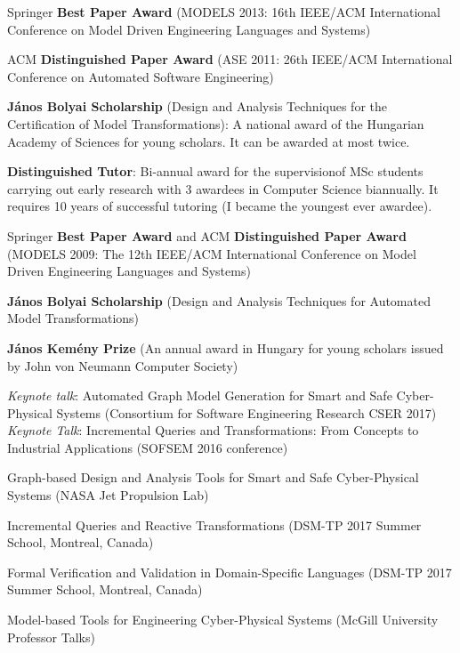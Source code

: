 \documentclass{xetexCV}
\begin{document}
Springer  \textbf{Best Paper Award} (MODELS 2013: 16th IEEE/ACM International Conference on Model Driven 
Engineering Languages and Systems) 

ACM \textbf{Distinguished Paper Award} (ASE 2011: 26th IEEE/ACM International Conference on Automated Software Engineering) 

\textbf{J\'anos Bolyai Scholarship} (Design and Analysis Techniques for the Certification of Model Transformations): A national award of the Hungarian Academy of Sciences for young scholars. It can be awarded
at most twice.

\textbf{Distinguished Tutor}:  Bi-annual award for the supervisionof MSc students carrying out early research with 3 awardees in Computer Science biannually. It requires 10 years of successful tutoring (I became the youngest ever awardee). 

Springer \textbf{Best Paper Award} and ACM \textbf{Distinguished Paper Award} \newline (MODELS
2009: The 12th IEEE/ACM International Conference on Model Driven Engineering Languages and
Systems) 

\textbf{J\'anos Bolyai Scholarship}  (Design and Analysis Techniques
for Automated Model Transformations) 

\textbf{J\'anos Kem\'eny Prize } (An annual
award in Hungary for young scholars issued by John von Neumann Computer Society)


\emph{Keynote talk}: Automated  Graph Model Generation for Smart and Safe Cyber-Physical Systems (Consortium for Software Engineering Research CSER 2017) \\

\emph{Keynote Talk}:  Incremental Queries and Transformations: From Concepts to Industrial Applications  (SOFSEM 2016 conference) 

Graph-based  Design and Analysis Tools for Smart and Safe Cyber-Physical Systems (NASA Jet Propulsion Lab) 

Incremental Queries and Reactive Transformations (DSM-TP 2017 Summer School, Montreal, Canada)

Formal Verification and Validation in Domain-Specific Languages (DSM-TP 2017 Summer School, Montreal, Canada)
	
Model-based Tools for Engineering Cyber-Physical Systems (McGill University Professor Talks)
\end{document}
